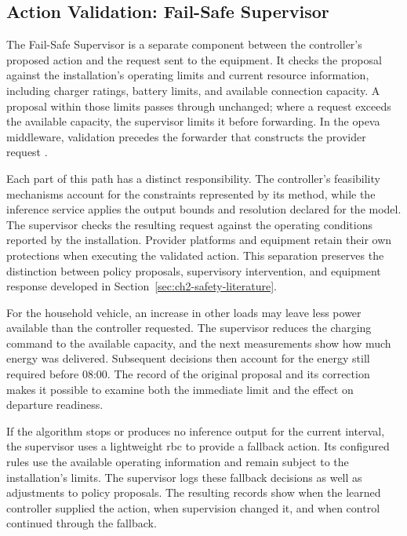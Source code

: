\subsection{Action Validation: Fail-Safe Supervisor}
\label{sec:energaize-supervision}

The Fail-Safe Supervisor is a separate component between the controller's proposed action and the request sent to the equipment. It checks the proposal against the installation's operating limits and current resource information, including charger ratings, battery limits, and available connection capacity. A proposal within those limits passes through unchanged; where a request exceeds the available capacity, the supervisor limits it before forwarding. In the \gls{opeva} middleware, validation precedes the forwarder that constructs the provider request \parencite{opeva2026d63}.

Each part of this path has a distinct responsibility. The controller's feasibility mechanisms account for the constraints represented by its method, while the inference service applies the output bounds and resolution declared for the model. The supervisor checks the resulting request against the operating conditions reported by the installation. Provider platforms and equipment retain their own protections when executing the validated action. This separation preserves the distinction between policy proposals, supervisory intervention, and equipment response developed in Section~\ref{sec:ch2-safety-literature}.

For the household vehicle, an increase in other loads may leave less power available than the controller requested. The supervisor reduces the charging command to the available capacity, and the next measurements show how much energy was delivered. Subsequent decisions then account for the energy still required before 08:00. The record of the original proposal and its correction makes it possible to examine both the immediate limit and the effect on departure readiness.

If the algorithm stops or produces no inference output for the current interval, the supervisor uses a lightweight \gls{rbc} to provide a fallback action. Its configured rules use the available operating information and remain subject to the installation's limits. The supervisor logs these fallback decisions as well as adjustments to policy proposals. The resulting records show when the learned controller supplied the action, when supervision changed it, and when control continued through the fallback.

